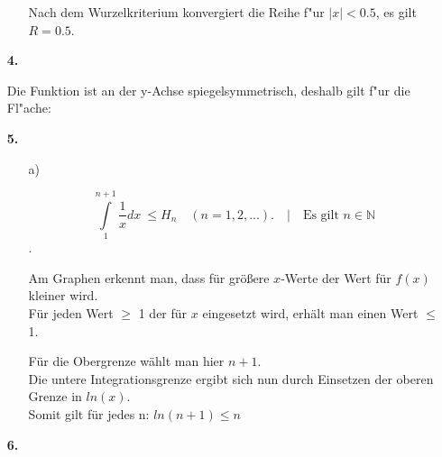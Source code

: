 \documentclass[a4paper,11pt,fleqn]{scrartcl}
\begin{document}
\begin{enumerate}
\begin{enumerate}
        Nach dem Wurzelkriterium konvergiert die Reihe f"ur $|x| < 0.5$, es gilt $R = 0.5$.
    \end{enumerate}
    

\item[\textbf{4.}]

                Die Funktion ist an der y-Achse spiegelsymmetrisch, deshalb gilt f"ur die Fl"ache:

\item[\textbf{5.}]
            \begin{enumerate}

                \item[a)]

                        $$ \int\limits_{1}^{n+1}  \frac{1}{x} dx  \ \leq H_n \quad (n=1,2,...). \quad \Big| \quad \text{Es gilt }n \in \mathbb{N}$$ . 




                Am Graphen erkennt man, dass für größere $x$-Werte der Wert für $f(x)$ kleiner wird. \\
                Für jeden Wert $\geq$ 1 der für $x$ eingesetzt wird, erhält man einen Wert $\leq$ 1. 

                Für die Obergrenze wählt man hier $n+1$. \\ Die untere Integrationsgrenze ergibt sich nun durch Einsetzen der oberen Grenze in $ln(x)$.\\
               Somit gilt für jedes n: $ln(n+1) \leq n$\\
               


            \end{enumerate}


\item[\textbf{6.}]

\end{enumerate}
\end{document}
